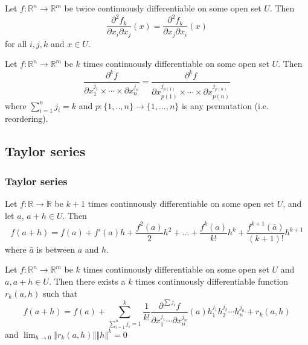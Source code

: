 \documentclass[compress]{beamer}
\def\R{\mathbb{R}}
\newcommand{\norm}[1]{\left\Vert {#1} \right\Vert}
\renewcommand{\to}{{\rightarrow}}
\begin{document}
\begin{frame}
  \begin{theorem}
    Let $f: \R^n \to \R^m$ be twice continuously differentiable on some
    open set $U$. Then
    \[ \frac{\partial^2 f_k}{\partial x_i \partial
      x_j}(x) =  \frac{\partial^2 f_k}{\partial x_j \partial
      x_i} (x) \]
    for all $i,j,k$ and $ x \in U$.
  \end{theorem}
\end{frame}

\begin{frame}
  \begin{corollary}
    Let $f: \R^n \to \R^m$ be $k$ times continuously differentiable on
    some open set $U$. Then 
    \[ \frac{\partial^k f}{\partial x_1^{j_1} \times \cdots
      \times \partial x_n^{j_n}} = 
    \frac{\partial^k f}{\partial x_{p(1)}^{j_{p(1)}} \times \cdots \times \partial
      x_{p(n)}^{j_{p(n)}}} \]
    where $\sum_{i=1}^n j_i = k$ and $p:\{1,..,n\} \to \{1,...,n\}$ is
    any permutation (i.e. reordering).
  \end{corollary}
\end{frame}

\subsection{Taylor series}
\begin{frame}\frametitle{Taylor series}
  \begin{theorem}
    Let $f: \R \to \R$ be $k+1$ times continuously differentiable on some
    open set $U$, and let $a$, $a+h \in U$. Then 
    \[ f(a+h) = f(a) + f'(a) h + \frac{f^2(a)}{2} h^2 + ... +
    \frac{f^k(a)}{k!} h^k + \frac{f^{k+1}(\bar{a})}{(k+1)!} h^{k+1} 
    \]
    where $\bar{a}$ is between $a$ and $h$. 
  \end{theorem}
\end{frame}

\begin{frame}
  \begin{theorem}
    Let $f:\R^n \to \R^m$ be $k$ times continuously differentiable on
    some open set $U$ and $a, a+h \in U$. Then there exists a $k$ times
    continuously differentiable function $r_k(a,h)$ such that
    \[ f(a+h) = f(a) + \sum_{\sum_{i=1}^n {j_i}=1}^k\frac{1}{k!}
    \frac{\partial^{\sum j_i} f}{\partial x_{1}^{j_1} \cdots \partial
      x_{n}^{j_n}}(a) h_1^{j_1}h_2^{j_2} \cdots h_n^{j_n} +
  r_k(a,h) \]
  and $\lim_{h \to 0} \norm{r_k(a,h)}{\norm{h}^k} = 0$
  \end{theorem}
\end{frame}
\end{document}
